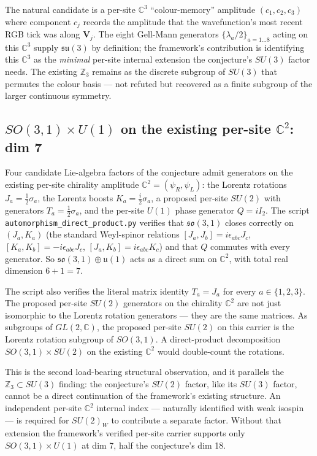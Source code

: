 The natural candidate is a per-site $\mathbb{C}^3$ ``colour-memory''
amplitude $(c_1, c_2, c_3)$ where component $c_j$ records the
amplitude that the wavefunction's most recent RGB tick was along
$\mathbf{V}_j$.  The eight Gell-Mann generators
$\{\lambda_a/2\}_{a=1\ldots 8}$ acting on this $\mathbb{C}^3$
supply $\mathfrak{su}(3)$ by definition; the framework's
contribution is identifying this $\mathbb{C}^3$ as the
\emph{minimal} per-site internal extension the conjecture's
$SU(3)$ factor needs.  The existing $\mathbb{Z}_3$ remains as the
discrete subgroup of $SU(3)$ that permutes the colour basis ---
not refuted but recovered as a finite subgroup of the larger
continuous symmetry.

\subsection{$SO(3,1) \times U(1)$ on the existing per-site $\mathbb{C}^2$: dim 7}
\label{subsec:lorentz_u1_on_C2}

Four candidate Lie-algebra factors of the conjecture admit
generators on the existing per-site chirality amplitude
$\mathbb{C}^2 = (\psi_R, \psi_L)$: the Lorentz rotations
$J_a = \tfrac{1}{2}\sigma_a$, the Lorentz boosts $K_a =
\tfrac{i}{2}\sigma_a$, a proposed per-site $SU(2)$ with generators
$T_a = \tfrac{1}{2}\sigma_a$, and the per-site $U(1)$ phase
generator $Q = i I_2$.  The script
\nolinkurl{automorphism_direct_product.py} verifies that
$\mathfrak{so}(3,1)$ closes correctly on $(J_a, K_a)$ (the standard
Weyl-spinor relations $[J_a, J_b] = i\epsilon_{abc}J_c$,
$[K_a, K_b] = -i\epsilon_{abc}J_c$, $[J_a, K_b] = i\epsilon_{abc}
K_c$) and that $Q$ commutes with every generator.  So
$\mathfrak{so}(3,1) \oplus \mathfrak{u}(1)$ acts as a direct sum
on $\mathbb{C}^2$, with total real dimension $6 + 1 = 7$.

The script also verifies the literal matrix identity $T_a = J_a$
for every $a \in \{1, 2, 3\}$.  The proposed per-site $SU(2)$
generators on the chirality $\mathbb{C}^2$ are not just isomorphic
to the Lorentz rotation generators --- they are the same matrices.
As subgroups of $GL(2, \mathbb{C})$, the proposed per-site $SU(2)$
on this carrier is the Lorentz rotation subgroup of $SO(3,1)$.  A
direct-product decomposition $SO(3,1) \times SU(2)$ on the
existing $\mathbb{C}^2$ would double-count the rotations.

This is the second load-bearing structural observation, and it
parallels the $\mathbb{Z}_3 \subset SU(3)$ finding: the
conjecture's $SU(2)$ factor, like its $SU(3)$ factor, cannot be a
direct continuation of the framework's existing structure.  An
independent per-site $\mathbb{C}^2$ internal index --- naturally
identified with weak isospin --- is required for $SU(2)_W$ to
contribute a separate factor.  Without that extension the
framework's verified per-site carrier supports only $SO(3,1)
\times U(1)$ at dim 7, half the conjecture's dim 18.

